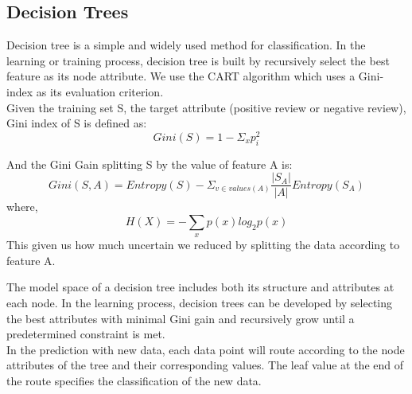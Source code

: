 \documentclass[11pt]{article}
\begin{document}
\subsection{Decision Trees}
Decision tree is a simple and widely used method for classification. In the learning or training process, decision tree is built by recursively select the best feature as its node attribute. We use the CART algorithm which uses a Gini-index as its evaluation criterion.\\ Given the training set S, the target attribute (positive review or negative review), Gini index of S is defined as:
$$Gini(S) = 1 - \Sigma_{x} p_i^2$$

And the Gini Gain splitting S by the value of feature A is:
$$Gini(S, A) = Entropy(S) - \Sigma_{v \in values(A)} \frac{|S_A|}{|A|} Entropy(S_A)$$
where,
$$ H(X) = - \sum_x p(x) log_2p(x) $$
This given us how much uncertain we reduced by splitting the data according to feature A.

The model space of a decision tree includes both its structure and attributes at each node. In the learning process, decision trees can be developed by selecting the best attributes with minimal Gini gain and recursively grow until a predetermined constraint is met.\\

In the prediction with new data, each data point will route according to the node attributes of the tree and their corresponding values. The leaf value at the end of the route specifies the classification of the new data.\\
%
%
%
\end{document}
